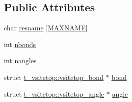 \subsection*{\-Public \-Attributes}
\begin{DoxyCompactItemize}
\item 
char \hyperlink{structt__vsitetop_a0063673337d992b2aa4472dcf6dbe045}{resname} \mbox{[}\hyperlink{gen__vsite_8c_ac881f02a50b29d3ffa5b1f4a0e4f9568}{\-M\-A\-X\-N\-A\-M\-E}\mbox{]}
\item 
int \hyperlink{structt__vsitetop_a6905a08625396ff25c673b367694bff0}{nbonds}
\item 
int \hyperlink{structt__vsitetop_ab6bce5dfd773ee15a2021f715460a5e7}{nangles}
\item 
struct \hyperlink{structt__vsitetop_1_1vsitetop__bond}{t\-\_\-vsitetop\-::vsitetop\-\_\-bond} $\ast$ \hyperlink{structt__vsitetop_a0f831e770c224eed94418543e5c4fe57}{bond}
\item 
struct \hyperlink{structt__vsitetop_1_1vsitetop__angle}{t\-\_\-vsitetop\-::vsitetop\-\_\-angle} $\ast$ \hyperlink{structt__vsitetop_abdf4ff083d791dade7d1b837109c9742}{angle}
\end{DoxyCompactItemize}


